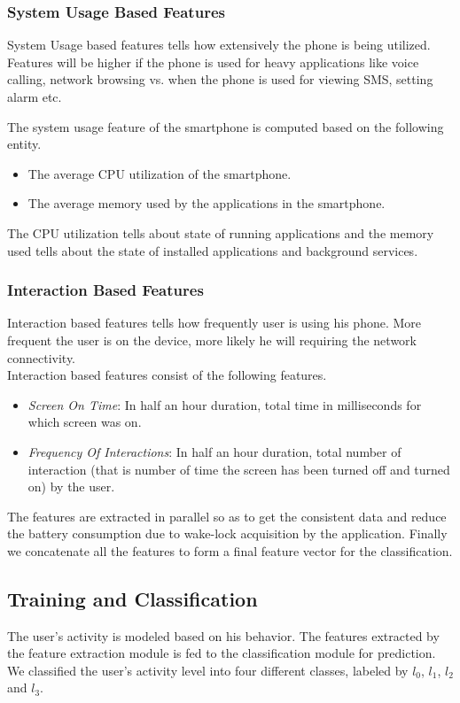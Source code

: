 \subsubsection{System Usage Based Features}
System Usage based
features tells how extensively the phone is being utilized. 
Features will be higher if
the phone is used for heavy applications like voice calling, network browsing  vs. when the phone is used for viewing SMS, setting alarm etc.

The system usage feature of the smartphone is computed based on the
following entity.

\begin{itemize}
\item The average CPU utilization of the smartphone.
\item The average memory used by the applications in the smartphone.
\end{itemize}
The CPU utilization tells about state of running applications and the memory used tells about the state of installed applications and background services. 

\subsubsection{Interaction Based Features}
Interaction based features
tells how frequently user is using his phone. More frequent the
user is on the device, more likely he will requiring the network 
connectivity.\\
Interaction based features consist of the following features.
\begin{itemize}
\item \emph{Screen On Time}: In half an hour duration, total time in milliseconds
for which screen was on.
\item \emph{Frequency Of Interactions}: In half an hour duration, total number of interaction (that is number of time the screen has been turned off and turned on) by the user.
\end{itemize}
The features are extracted in parallel so as to get the
consistent data and reduce the battery consumption due to wake-lock acquisition by the application. 
Finally we concatenate all the features to form a final feature vector for the classification.

\subsection{Training and Classification}
The user's activity is modeled based on his behavior.
The features extracted by the feature extraction
module is fed to the classification module for prediction.
We classified the user's activity level into four different classes, 
labeled by $l_0$, $l_1$, $l_2$ and $l_3$.


